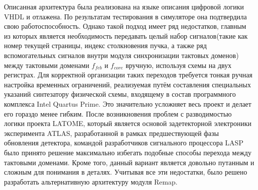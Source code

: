Описанная архитектура была реализована на языке описания цифровой логики VHDL и отлажена. По результатам тестирования в симуляторе она подтвердила свою работоспособность. Однако такой подход имеет ряд недостатков, главным из которых является необходимость передавать целый набор сигналов(такие как номер текущей страницы, индекс столкновения пучка, а также ряд вспомогательных сигналов внутри модуля синхронизации тактовых доменов) между тактовыми доменами $f_{feb}$ и $f_{core}$ вручную, используя схемы на двух регистрах. Для корректной организации таких переходов требуется тонкая ручная настройка временных ограничений, реализуемая путём составления специальных указаний синтезатору физической схемы, входящему в состав программного комплекса Intel Quartus Prime. Это значительно усложняет весь проект и делает его гораздо менее гибким. После возникновения проблем с разводимостью логики проекта LATOME, который является основой задетекторной электроники эксперимента ATLAS, разработанной в рамках предшествующей фазы обновления детектора, командой разработчиков сигнального процессора LASP было принято решение максимально избегать подобные способы перехода между тактовыми доменами. Кроме того, данный вариант является довольно путанным и сложным для понимания в деталях. Учитывая все эти недостатки, было решено разработать альтернативную архитектуру модуля Remap.\par
